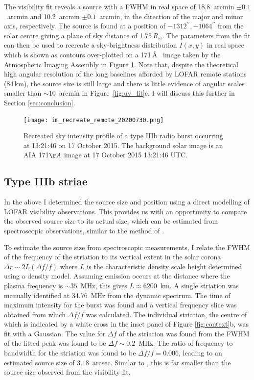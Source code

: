 The visibility fit reveals a source with a FWHM in real space of 18.8~arcmin $\pm 0.1$~arcmin and 10.2~arcmin $\pm 0.1$~arcmin, in the direction of the major and minor axis, respectively. The source is found at a position of $-1312^{\prime\prime}, -1064^{\prime\prime}$ from the solar centre giving a plane of sky distance of 1.75$\, R_\odot$. The parameters from the fit can then be used to recreate a sky-brightness distribution $I(x,y)$ in real space which is shown as contours over-plotted on a 171\,\AA~ image taken by the Atmospheric Imaging Assembly \citep[AIA;][]{Lemen2012} in Figure \ref{fig:recreate}. Note that, despite the theoretical high angular resolution of the long baselines afforded by LOFAR remote stations (84\,km), the source size is still large and there is little evidence of angular scales smaller than $\sim$10~arcmin in Figure~\ref{fig:uv_fit}c. I will discuss this further in Section \ref{sec:conclusion}.

\begin{figure}
    \centering
    \texttt{[image: im\_recreate\_remote\_20200730.png]}
    \caption[Recreated sky intensity profile of a type IIIb radio burst.]{Recreated sky intensity profile of a type IIIb radio burst occurring at 13:21:46 on 17 October 2015. The background solar image is an AIA 171$\AA$ image at 17 October 2015 13:21:46 UTC.} 
    \label{fig:recreate}
\end{figure}


\subsection{Type IIIb striae}
In the above I determined the source size and position using a direct modelling of LOFAR visibility observations. This provides us with an opportunity to compare the observed source size to its actual size, which can be estimated from spectroscopic observations, similar to the method of \cite{Kontar2017}.

To estimate the source size from spectroscopic measurements, I relate the FWHM of the frequency of the striation to its vertical extent in the solar corona $\Delta r {\sim} 2L \left(\Delta f/f\right)$ where $L$ is the characteristic density scale height \citep{Kontar2017} determined using a \cite{Newkirk1961} density model. Assuming emission occurs at the distance where the plasma frequency is $\sim 35$~MHz, this gives $L \approx 6200$~km.
A single striation was manually identified at 34.76~MHz from the dynamic spectrum. The time of maximum intensity for the burst was found and a vertical frequency slice was obtained from which $\Delta f/f$ was calculated. The individual striation, the centre of which is indicated by a white cross in the inset panel of Figure \ref{fig:context}b, was fit with a Gaussian. The value for $\Delta f$ of the striation was found from the FWHM of the fitted peak was found to be $\Delta f \sim 0.2$~MHz. The ratio of frequency to bandwidth for the striation was found to be $\Delta f/f = 0.006$, leading to an estimated source size of $3.18$~arcsec. 
Similar to \cite{Kontar2017}, this is far smaller than the source size observed from the visibility fit.

